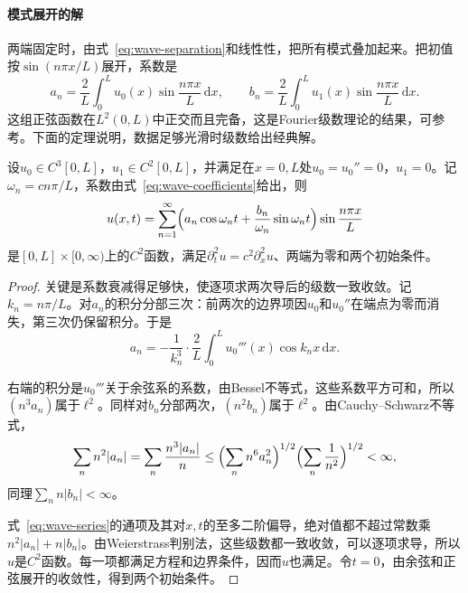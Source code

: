 \paragraph{模式展开的解}
两端固定时，由式~\eqref{eq:wave-separation}和线性性，把所有模式叠加起来。把初值按$\sin(n\pi x/L)$展开，系数是
\begin{equation}
 a_n=\frac2L\int_0^{L}u_0(x)\sin\frac{n\pi x}{L}\,\mathrm{d}x,\qquad b_n=\frac2L\int_0^{L}u_1(x)\sin\frac{n\pi x}{L}\,\mathrm{d}x .
 \label{eq:wave-coefficients}
\end{equation}
这组正弦函数在$L^{2}(0,L)$中正交而且完备，这是Fourier级数理论的结果，可参考。下面的定理说明，数据足够光滑时级数给出经典解。

\begin{theorem}[两端固定的模式解]
\label{thm:wave-series}
设$u_0\in C^{3}[0,L]$，$u_1\in C^{2}[0,L]$，并满足在$x=0,L$处$u_0=u_0''=0$，$u_1=0$。记$\omega_n=cn\pi/L$，系数由式~\eqref{eq:wave-coefficients}给出，则
\begin{equation}
 u(x,t)=\sum_{n=1}^{\infty}\Bigl(a_n\cos\omega_nt+\frac{b_n}{\omega_n}\sin\omega_nt\Bigr)\sin\frac{n\pi x}{L}
 \label{eq:wave-series}
\end{equation}
是$[0,L]\times[0,\infty)$上的$C^{2}$函数，满足$\partial_t^{2}u=c^{2}\partial_x^{2}u$、两端为零和两个初始条件。
\end{theorem}

\begin{proof}
关键是系数衰减得足够快，使逐项求两次导后的级数一致收敛。记$k_n=n\pi/L$。对$a_n$的积分分部三次：前两次的边界项因$u_0$和$u_0''$在端点为零而消失，第三次仍保留积分。于是
\[
 a_n=-\frac{1}{k_n^{3}}\cdot\frac2L\int_0^{L}u_0'''(x)\cos k_nx\,\mathrm{d}x .
\]

右端的积分是$u_0'''$关于余弦系的系数，由Bessel不等式，这些系数平方可和，所以$(n^{3}a_n)$属于$\ell^{2}$。同样对$b_n$分部两次，$(n^{2}b_n)$属于$\ell^{2}$。由Cauchy--Schwarz不等式，
\[
 \sum_{n}n^{2}\lvert a_n\rvert=\sum_{n}\frac{n^{3}\lvert a_n\rvert}{n}\leq\Bigl(\sum_{n}n^{6}a_n^{2}\Bigr)^{1/2}\Bigl(\sum_{n}\frac1{n^{2}}\Bigr)^{1/2}<\infty,
\]
同理$\sum_nn\lvert b_n\rvert<\infty$。

式~\eqref{eq:wave-series}的通项及其对$x,t$的至多二阶偏导，绝对值都不超过常数乘$n^{2}\lvert a_n\rvert+n\lvert b_n\rvert$。由Weierstrass判别法，这些级数都一致收敛，可以逐项求导，所以$u$是$C^{2}$函数。每一项都满足方程和边界条件，因而$u$也满足。令$t=0$，由余弦和正弦展开的收敛性，得到两个初始条件。
\end{proof}

